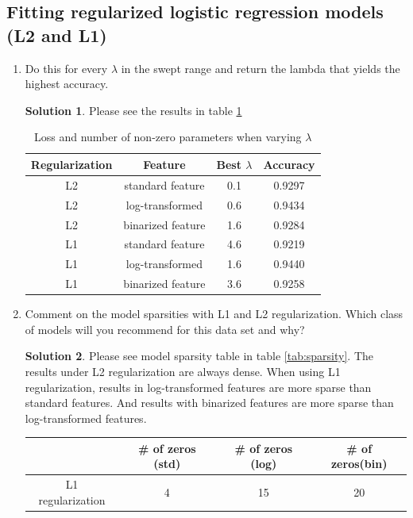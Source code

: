 \documentclass[]{book}
\theoremstyle{definition}
\newtheorem*{soln}{Solution}
\begin{document}
\subsection*{Fitting regularized logistic regression models (L2 and L1)}
\begin{enumerate}
	\item  Do this for every $\lambda$ in the swept range and return the lambda that yields the highest accuracy.
	\begin{soln}
		Please see the results in table \ref{tab:results}
		\begin{table}[H]
			\centering
			\begin{tabular}{cccc}
				\hline 
				Regularization & Feature & Best $\lambda$ & Accuracy \\ 
				\hline
				L2 & standard feature & 0.1 &0.9297   \\ 
				
				L2 & log-transformed & 0.6 &0.9434   \\ 
				
				L2 & binarized feature& 1.6 &0.9284   \\ 
				
				L1 & standard feature & 4.6 &0.9219   \\ 
				
				L1 & log-transformed & 1.6 &0.9440   \\ 
				
				L1 & binarized feature& 3.6 & 0.9258  \\
				\hline 
			\end{tabular} 
			\caption{Loss and number of non-zero parameters when varying $\lambda$}
			\label{tab:results}
		\end{table}
	\end{soln}
	
	\item Comment on the model sparsities with L1 and L2 regularization. Which class of models will you recommend for this data set and why?
	\begin{soln}
		Please see model sparsity table in table \ref{tab:sparsity}. The results under L2 regularization are always dense. When using L1 regularization, results in log-transformed features are more sparse than standard features. And results with binarized features are more sparse than log-transformed features.
		\begin{table}[H]
			\centering
			\begin{tabular}{cccc}
				\hline 
				& \# of zeros (std) & \# of zeros (log) & \# of zeros(bin) \\ 
				\hline 
				L1 regularization & 4 & 15 & 20 \\ 
				

\end{tabular}
\end{table}
\end{soln}
\end{enumerate}
\end{document}
